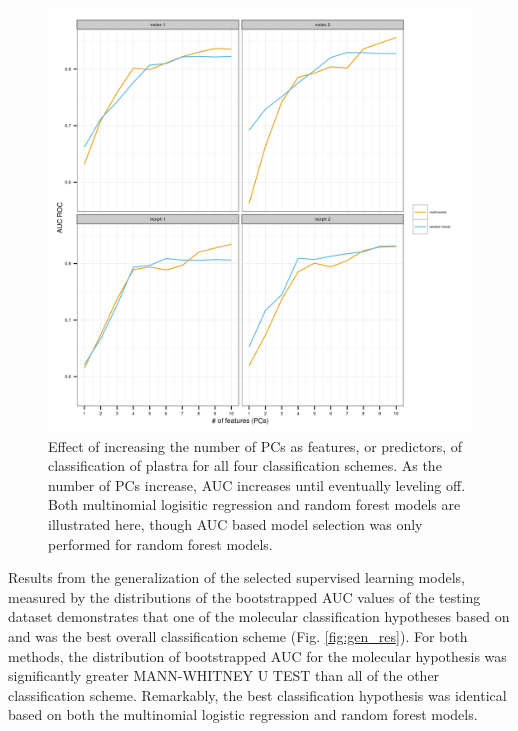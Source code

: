 \documentclass[12pt,letterpaper]{article}\usepackage{graphicx, color}
\begin{document}
\begin{figure}[ht]
  \centering
  \includegraphics[width = \textwidth]{figure/roc_sel}
  \caption{Effect of increasing the number of PCs as features, or predictors, of classification of plastra for all four classification schemes. As the number of PCs increase, AUC increases until eventually leveling off. Both multinomial logisitic regression and random forest models are illustrated here, though AUC based model selection was only performed for random forest models.}
  \label{fig:roc}
\end{figure}


Results from the generalization of the selected supervised learning models, measured by the distributions of the bootstrapped AUC values of the testing dataset demonstrates that one of the molecular classification hypotheses based on \citet{Spinks2005} and \citet{Spinks2010} was the best overall classification scheme (Fig. \ref{fig:gen_res}). For both methods, the distribution of bootstrapped AUC for the molecular hypothesis was significantly greater MANN-WHITNEY U TEST than all of the other classification scheme. Remarkably, the best classification hypothesis was identical based on both the multinomial logistic regression and random forest models.
\end{document}
